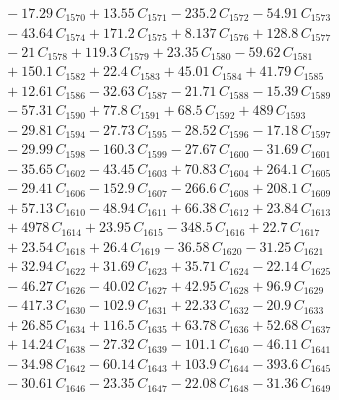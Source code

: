 \documentclass[a4paper,11pt]{article}
\begin{document}
\begin{align}
&\quad - 17.29\,C_{1570} + 13.55\,C_{1571} - 235.2\,C_{1572} - 54.91\,C_{1573} \nonumber\\
&\quad - 43.64\,C_{1574} + 171.2\,C_{1575} + 8.137\,C_{1576} + 128.8\,C_{1577} \nonumber\\
&\quad - 21\,C_{1578} + 119.3\,C_{1579} + 23.35\,C_{1580} - 59.62\,C_{1581} \nonumber\\
&\quad + 150.1\,C_{1582} + 22.4\,C_{1583} + 45.01\,C_{1584} + 41.79\,C_{1585} \nonumber\\
&\quad + 12.61\,C_{1586} - 32.63\,C_{1587} - 21.71\,C_{1588} - 15.39\,C_{1589} \nonumber\\
&\quad - 57.31\,C_{1590} + 77.8\,C_{1591} + 68.5\,C_{1592} + 489\,C_{1593} \nonumber\\
&\quad - 29.81\,C_{1594} - 27.73\,C_{1595} - 28.52\,C_{1596} - 17.18\,C_{1597} \nonumber\\
&\quad - 29.99\,C_{1598} - 160.3\,C_{1599} - 27.67\,C_{1600} - 31.69\,C_{1601} \nonumber\\
&\quad - 35.65\,C_{1602} - 43.45\,C_{1603} + 70.83\,C_{1604} + 264.1\,C_{1605} \nonumber\\
&\quad - 29.41\,C_{1606} - 152.9\,C_{1607} - 266.6\,C_{1608} + 208.1\,C_{1609} \nonumber\\
&\quad + 57.13\,C_{1610} - 48.94\,C_{1611} + 66.38\,C_{1612} + 23.84\,C_{1613} \nonumber\\
&\quad + 4978\,C_{1614} + 23.95\,C_{1615} - 348.5\,C_{1616} + 22.7\,C_{1617} \nonumber\\
&\quad + 23.54\,C_{1618} + 26.4\,C_{1619} - 36.58\,C_{1620} - 31.25\,C_{1621} \nonumber\\
&\quad + 32.94\,C_{1622} + 31.69\,C_{1623} + 35.71\,C_{1624} - 22.14\,C_{1625} \nonumber\\
&\quad - 46.27\,C_{1626} - 40.02\,C_{1627} + 42.95\,C_{1628} + 96.9\,C_{1629} \nonumber\\
&\quad - 417.3\,C_{1630} - 102.9\,C_{1631} + 22.33\,C_{1632} - 20.9\,C_{1633} \nonumber\\
&\quad + 26.85\,C_{1634} + 116.5\,C_{1635} + 63.78\,C_{1636} + 52.68\,C_{1637} \nonumber\\
&\quad + 14.24\,C_{1638} - 27.32\,C_{1639} - 101.1\,C_{1640} - 46.11\,C_{1641} \nonumber\\
&\quad - 34.98\,C_{1642} - 60.14\,C_{1643} + 103.9\,C_{1644} - 393.6\,C_{1645} \nonumber\\
&\quad - 30.61\,C_{1646} - 23.35\,C_{1647} - 22.08\,C_{1648} - 31.36\,C_{1649} \nonumber\\

\end{align}
\end{document}
